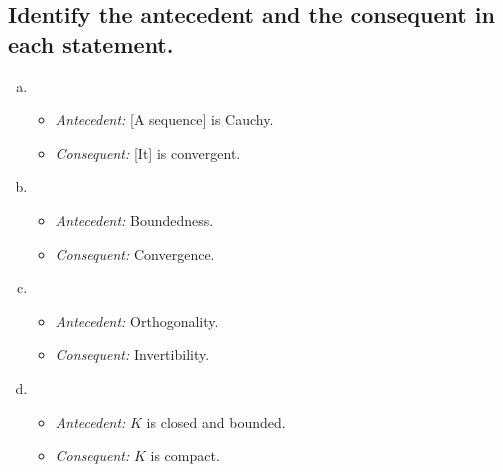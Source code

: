 \documentclass[12pt]{scrartcl} %
\begin{document}
\subsection{Identify the antecedent and the consequent in each statement.}
\begin{enumerate}[(a)]
	\item
	\begin{itemize}
		\item \emph{Antecedent:} [A sequence] is Cauchy.
		\item \emph{Consequent:} [It] is convergent.
	\end{itemize}

	\item
	\begin{itemize}
		\item \emph{Antecedent:} Boundedness.
		\item \emph{Consequent:} Convergence.
	\end{itemize}
	
	\item 
	\begin{itemize}
		\item \emph{Antecedent:} Orthogonality.
		\item \emph{Consequent:} Invertibility.
	\end{itemize}
	
	\item 
	\begin{itemize}
		\item \emph{Antecedent:} $K$ is closed and bounded.
		\item \emph{Consequent:} $K$ is compact.
	\end{itemize}
\end{enumerate}
\end{document}
